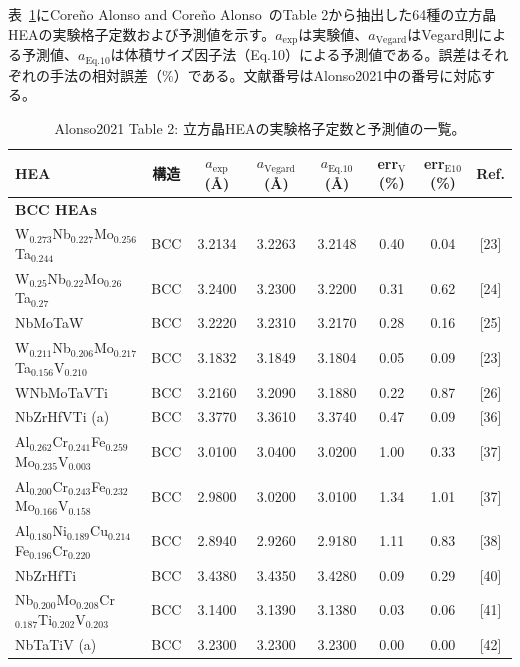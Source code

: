 \documentclass[a4paper,10pt,5p]{elsarticle}
\begin{document}
表~\ref{tab:appendix_alonso}にCoreño Alonso and Coreño Alonso~\cite{Alonso2021}のTable 2から抽出した64種の立方晶HEAの実験格子定数および予測値を示す。$a_\mathrm{exp}$は実験値、$a_\mathrm{Vegard}$はVegard則による予測値、$a_\mathrm{Eq.10}$は体積サイズ因子法（Eq.10）による予測値である。誤差はそれぞれの手法の相対誤差（\%）である。文献番号はAlonso2021中の番号に対応する。

\begin{table}[htbp]
\centering
\caption{Alonso2021 Table 2: 立方晶HEAの実験格子定数と予測値の一覧。}
\label{tab:appendix_alonso}
\footnotesize
\begin{tabular}{lccccccc}
\hline
\textbf{HEA} & \textbf{構造} & $a_\mathrm{exp}$ (\AA) & $a_\mathrm{Vegard}$ (\AA) & $a_\mathrm{Eq.10}$ (\AA) & \textbf{err$_\mathrm{V}$} (\%) & \textbf{err$_\mathrm{E10}$} (\%) & \textbf{Ref.} \\
\hline
\multicolumn{8}{l}{\textbf{BCC HEAs}} \\
\hline
    W$_{0.273}$Nb$_{0.227}$Mo$_{0.256}$Ta$_{0.244}$ & BCC & 3.2134 & 3.2263 & 3.2148 & 0.40 & 0.04 & [23] \\
    W$_{0.25}$Nb$_{0.22}$Mo$_{0.26}$Ta$_{0.27}$ & BCC & 3.2400 & 3.2300 & 3.2200 & 0.31 & 0.62 & [24] \\
    NbMoTaW & BCC & 3.2220 & 3.2310 & 3.2170 & 0.28 & 0.16 & [25] \\
    W$_{0.211}$Nb$_{0.206}$Mo$_{0.217}$Ta$_{0.156}$V$_{0.210}$ & BCC & 3.1832 & 3.1849 & 3.1804 & 0.05 & 0.09 & [23] \\
    WNbMoTaVTi & BCC & 3.2160 & 3.2090 & 3.1880 & 0.22 & 0.87 & [26] \\
    NbZrHfVTi (a) & BCC & 3.3770 & 3.3610 & 3.3740 & 0.47 & 0.09 & [36] \\
    Al$_{0.262}$Cr$_{0.241}$Fe$_{0.259}$Mo$_{0.235}$V$_{0.003}$ & BCC & 3.0100 & 3.0400 & 3.0200 & 1.00 & 0.33 & [37] \\
    Al$_{0.200}$Cr$_{0.243}$Fe$_{0.232}$Mo$_{0.166}$V$_{0.158}$ & BCC & 2.9800 & 3.0200 & 3.0100 & 1.34 & 1.01 & [37] \\
    Al$_{0.180}$Ni$_{0.189}$Cu$_{0.214}$Fe$_{0.196}$Cr$_{0.220}$ & BCC & 2.8940 & 2.9260 & 2.9180 & 1.11 & 0.83 & [38] \\
    NbZrHfTi & BCC & 3.4380 & 3.4350 & 3.4280 & 0.09 & 0.29 & [40] \\
    Nb$_{0.200}$Mo$_{0.208}$Cr$_{0.187}$Ti$_{0.202}$V$_{0.203}$ & BCC & 3.1400 & 3.1390 & 3.1380 & 0.03 & 0.06 & [41] \\
    NbTaTiV (a) & BCC & 3.2300 & 3.2300 & 3.2300 & 0.00 & 0.00 & [42] \\

\end{tabular}
\end{table}
\end{document}
